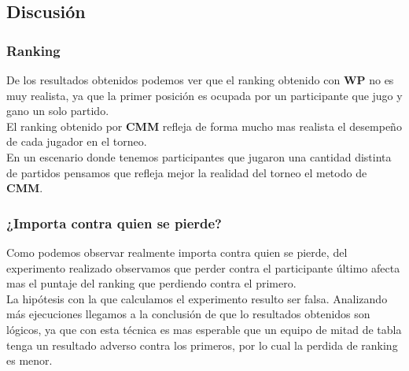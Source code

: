 \subsection{Discusión}


\subsubsection{Ranking}

De los resultados obtenidos podemos ver que el ranking obtenido con \textbf{WP} no es muy realista, ya que la primer posición es ocupada por un participante que jugo y gano un solo partido. \\

El ranking obtenido por \textbf{CMM} refleja de forma mucho mas realista el desempeño de cada jugador en el torneo. \\

En un escenario donde tenemos participantes que jugaron una cantidad distinta de partidos pensamos que refleja mejor la realidad del torneo el metodo de \textbf{CMM}. \\


\subsubsection{¿Importa contra quien se pierde?}

Como podemos observar realmente importa contra quien se pierde, del experimento realizado observamos que perder contra el participante último afecta mas el puntaje del ranking que perdiendo contra el primero. \\

La hipótesis con la que calculamos el experimento resulto ser falsa. Analizando más ejecuciones llegamos a la conclusión de que lo resultados obtenidos son lógicos, ya que con esta técnica es mas esperable que un equipo de mitad de tabla tenga un resultado adverso contra los primeros, por lo cual la perdida de ranking es menor.


